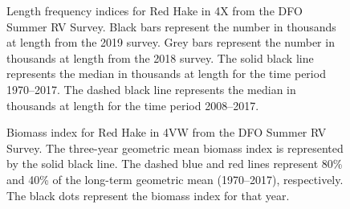 \documentclass[11pt]{book}
\begin{document}
\begin{figure}[htb]

{\centering {} 

}

\caption{Length frequency indices for Red Hake in 4X from the DFO Summer RV Survey. Black bars represent the number in thousands at length from the 2019 survey. Grey bars represent the number in thousands at length from the 2018 survey. The solid black line represents the median in thousands at length for the time period 1970--2017. The dashed black line represents the median in thousands at length for the time period 2008--2017.}\label{fig:110-fig-redhake-lengthfreq4X}
\end{figure}

\begin{figure}[htb]

{\centering {} 

}

\caption{Biomass index for Red Hake in 4VW from the DFO Summer RV Survey. The three-year geometric mean biomass index is represented by the solid black line. The dashed blue and red lines represent 80\% and 40\% of the long-term geometric mean (1970--2017), respectively. The black dots represent the biomass index for that year.}\label{fig:111-fig-redhake-biomass4VW}
\end{figure}
\end{document}
